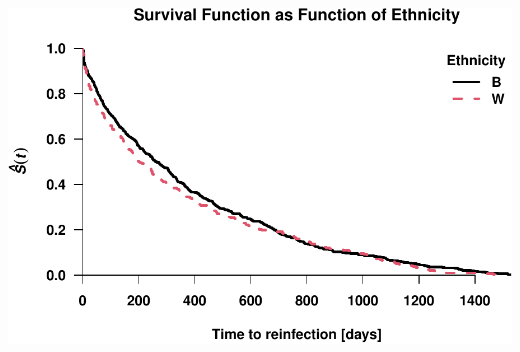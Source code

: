 \documentclass[
]{article}
\begin{document}
\includegraphics{practical_files/figure-latex/unnamed-chunk-8-1.pdf}
\end{document}
